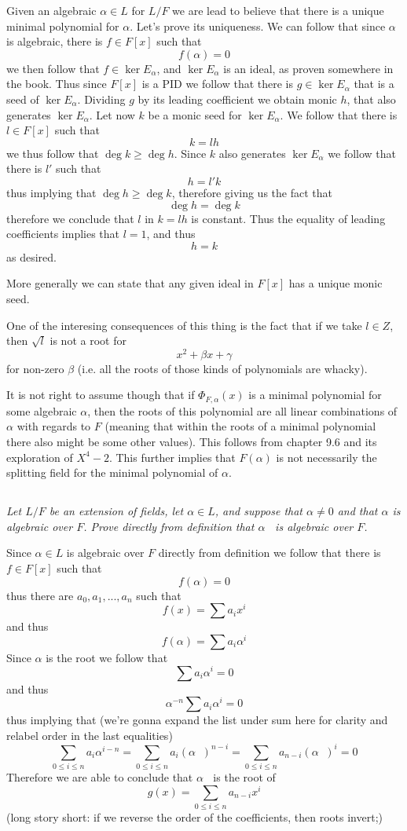 \documentclass[11pt,oneside,titlepage]{book}
\DeclareMathOperator \inv {^{-1}}
\begin{document}
Given an algebraic $\alpha \in L$ for $L/F$ we are lead to believe
that there is a unique minimal polynomial for $\alpha$. Let's prove its
uniqueness. We can follow that since $\alpha$ is algebraic, there is
$f \in F[x]$ such that
$$f(\alpha) = 0$$
we then follow that $f \in \ker E_\alpha$, and $\ker E_\alpha$ is an
ideal, as proven somewhere in the book. Thus since $F[x]$ is a PID
we follow that there is $g \in \ker E_\alpha$ that is a seed of
$\ker E_\alpha$. Dividing $g$ by its leading coefficient
we obtain monic $h$, that also generates $\ker E_\alpha$. Let now $k$
be a monic seed for $\ker E_\alpha$. We follow that there is $l \in F[x]$
such that
$$k = lh$$
we thus follow that $\deg k \geq \deg h$. Since $k$ also generates $\ker E_\alpha$
we follow that there is $l'$ such that
$$h = l'k$$
thus implying that $\deg h \geq \deg k$, therefore giving us the fact that
$$\deg h = \deg k$$
therefore we conclude that $l$ in $k = lh$ is constant. Thus the equality of
leading coefficients implies that $l = 1$, and thus 
$$h = k$$
as desired.

More generally we can state that any given ideal in $F[x]$ has a
unique monic seed.

One of the interesing consequences of this thing is the fact that if
we take $l \in Z$, then $\sqrt{l}$ is not a root for
$$x^2 + \beta x + \gamma$$
for non-zero $\beta$ (i.e. all the roots of those kinds of polynomials
are whacky).

It is not right to assume though that if $\Phi_{F, \alpha}(x)$ is a
minimal polynomial for some algebraic $\alpha$, then the roots of this
polynomial are all linear combinations of $\alpha$ with regards to $F$
(meaning that within the roots of a minimal polynomial there also
might be some other values). This follows from chapter 9.6 and its
exploration of $X^4 - 2$. This further implies that $F(\alpha)$
is not necessarily the splitting field for the minimal polynomial
of $\alpha$.

\subsection{}

\textit{Let $L/F$ be an extension of fields, let $\alpha \in L$, and suppose
  that $\alpha \neq 0$ and that $\alpha$ is algebraic over $F$.
  Prove directly from definition that $\alpha\inv$ is algebraic over $F$.}

Since $\alpha \in L$ is algebraic over $F$ directly from definition
we follow that there is $f \in F[x]$ such that
$$f(\alpha) = 0$$
thus there are $a_0, a_1, ..., a_n$ such that
$$f(x) = \sum{a_i x^i}$$
and thus
$$f(\alpha) = \sum{a_i \alpha^i}$$
Since $\alpha$ is the root we follow that
$$\sum{a_i \alpha^i} = 0$$
and thus
$$\alpha^{-n} \sum{a_i \alpha^i} = 0$$
thus implying that (we're gonna expand the list under sum here for
clarity and relabel order in the last equalities)
$$\sum_{0 \leq i \leq n}{a_i \alpha^{i - n}} =
\sum_{0 \leq i \leq n}{a_i (\alpha\inv)^{n - i}} =
\sum_{0 \leq i \leq n}{a_{n - i} (\alpha\inv)^{i}} = 0$$
Therefore we are able to conclude that $\alpha\inv$ is the root of 
$$g(x) = \sum_{0 \leq i \leq n}{a_{n - i} x^i}$$
(long story short: if we reverse the order of the coefficients, then
roots invert;)
\end{document}
